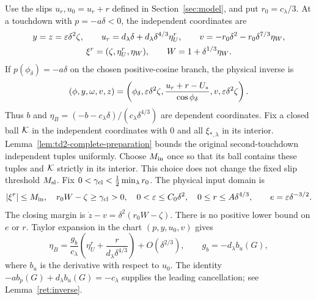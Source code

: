 Use the slips $u_r,u_0=u_r+r$ defined in Section~\ref{sec:model},
and put $r_0=c_\lambda/3$. At a touchdown with $p=-a\delta<0$, the independent coordinates are
\begin{equation}
 \begin{gathered}
 y=z=\varepsilon\delta^2\zeta,\qquad
 u_r=d_\lambda\delta+d_\lambda\delta^{4/3}\eta_U^r,\qquad
 v=-r_0\delta^2-r_0\delta^{7/3}\eta_W,\\
 \xi^r=(\zeta,\eta_U^r,\eta_W),\qquad
 W=1+\delta^{1/3}\eta_W.
 \label{loc:tuple}
 \end{gathered}
\end{equation}
If $p(\phi_\delta)=-a\delta$ on the chosen positive-cosine branch,
the physical inverse is
\begin{equation}
 (\phi,y,\omega,v,z)
 =\left(\phi_\delta,\varepsilon\delta^2\zeta,
       \frac{u_r+r-U_*}{\cos\phi_\delta},v,\varepsilon\delta^2\zeta\right).
 \label{loc:inverse}
\end{equation}
Thus $b$ and $\eta_B=(-b-c_\lambda\delta)/(c_\lambda\delta^{4/3})$
are dependent coordinates. Fix a closed ball $\mathcal K$ in the independent
coordinates with $0$ and all $\xi_{*,\lambda}$ in its interior.
Lemma~\ref{lem:td2-complete-preparation} bounds the original second-touchdown
independent tuples uniformly. Choose $M_{\rm in}$ once so that its ball
contains these tuples and $\mathcal K$ strictly in its interior.
This choice does not change the fixed slip threshold $M_{\rm sl}$.
Fix $0<\gamma_{\rm cl}<\frac12\min_\lambda r_0$.
The physical input domain is
\begin{equation}
 |\xi^r|\le M_{\rm in},\quad r_0W-\zeta\ge\gamma_{\rm cl}>0,
 \quad 0<\varepsilon\le C_0\delta^2,
 \quad 0\le r\le A\delta^{4/3},\qquad e=\varepsilon\delta^{-3/2}.
 \label{loc:domain}
\end{equation}
The closing margin is $\dot z-v=\delta^2(r_0W-\zeta)$.
There is no positive lower bound on $e$ or $r$.
Taylor expansion in the chart $(p,y,u_0,v)$ gives
\begin{equation}
 \eta_B=\frac{g_b}{c_\lambda}
       \left(\eta_U^r+\frac{r}{d_\lambda\delta^{4/3}}\right)
       +O(\delta^{2/3}),\qquad g_b=-d_\lambda b_u(G),
 \label{loc:dependent}
\end{equation}
where $b_u$ is the derivative with respect to $u_0$.
The identity $-ab_p(G)+d_\lambda b_u(G)=-c_\lambda$ supplies the
leading cancellation; see Lemma~\ref{ret:inverse}.

